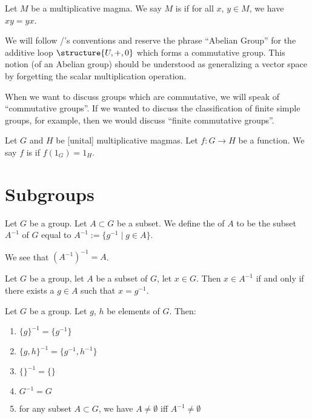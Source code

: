 \begin{definition}
Let $M$ be a multiplicative magma. We say $M$ is 
if for all $x$, $y\in M$, we have $xy=yx$.
\end{definition}

\begin{remark}
We will follow \Mizar/'s conventions and reserve the phrase ``Abelian Group''
for the additive loop $\structure{U,+,0}$ which forms a commutative group.
This notion (of an Abelian group) should be understood as generalizing
a vector space by forgetting the scalar multiplication operation.

When we want to discuss groups which are commutative, we will speak of
``commutative groups''. If we wanted to discuss the classification of
finite simple groups, for example, then we would discuss ``finite
commutative groups''.
\end{remark}

\begin{definition}
Let $G$ and $H$ be [unital] multiplicative magmas.
Let $f\colon G\to H$ be a function.
We say $f$ is  if $f(1_{G})=1_{H}$.
\end{definition}

\section{Subgroups}

\begin{definition}
Let $G$ be a group. Let $A\subset G$ be a subset.
We define the  of $A$ to be the subset $A^{-1}$ of $G$
equal to $A^{-1}:=\{g^{-1}\mid g\in A\}$.

We see that $(A^{-1})^{-1}=A$.
\end{definition}

\begin{theorem}
Let $G$ be a group, let $A$ be a subset of $G$, let $x\in G$.
Then $x\in A^{-1}$ if and only if there exists a $g\in A$ such that $x=g^{-1}$.
\end{theorem}

\begin{theorem}
Let $G$ be a group. Let $g$, $h$ be elements of $G$. Then:
\begin{enumerate}
\item $\{g\}^{-1}=\{g^{-1}\}$
\item $\{g,h\}^{-1}=\{g^{-1},h^{-1}\}$
\item $\{\}^{-1}=\{\}$
\item $G^{-1}=G$
\item for any subset $A\subset G$, we have $A\neq\emptyset$ iff $A^{-1}\neq\emptyset$
\end{enumerate}
\end{theorem}

